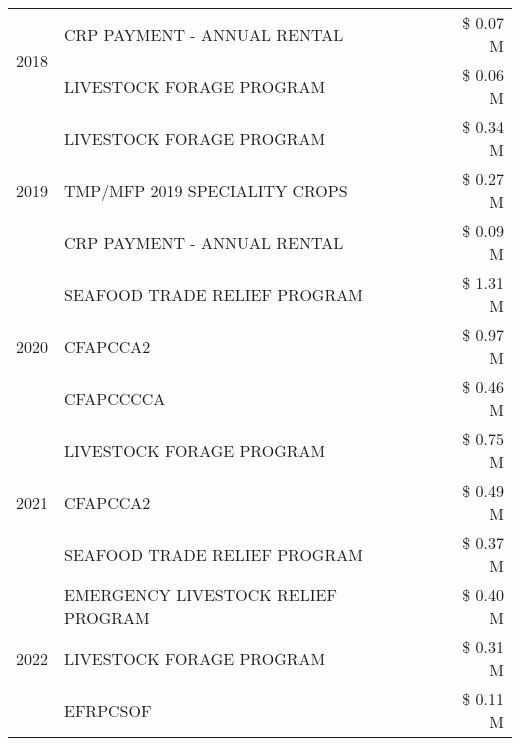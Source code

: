 \begin{tabular}{llr}
\cline{1-3}
\multirow[t]{2}{*}{2018} & CRP PAYMENT - ANNUAL RENTAL & \$ 0.07 M \\
 & LIVESTOCK FORAGE PROGRAM & \$ 0.06 M \\
\cline{1-3}
\multirow[t]{3}{*}{2019} & LIVESTOCK FORAGE PROGRAM & \$ 0.34 M \\
 & TMP/MFP 2019 SPECIALITY CROPS & \$ 0.27 M \\
 & CRP PAYMENT - ANNUAL RENTAL & \$ 0.09 M \\
\cline{1-3}
\multirow[t]{3}{*}{2020} & SEAFOOD TRADE RELIEF PROGRAM & \$ 1.31 M \\
 & CFAPCCA2 & \$ 0.97 M \\
 & CFAPCCCCA & \$ 0.46 M \\
\cline{1-3}
\multirow[t]{3}{*}{2021} & LIVESTOCK FORAGE PROGRAM & \$ 0.75 M \\
 & CFAPCCA2 & \$ 0.49 M \\
 & SEAFOOD TRADE RELIEF PROGRAM & \$ 0.37 M \\
\cline{1-3}
\multirow[t]{3}{*}{2022} & EMERGENCY LIVESTOCK RELIEF PROGRAM & \$ 0.40 M \\
 & LIVESTOCK FORAGE PROGRAM & \$ 0.31 M \\
 & EFRPCSOF & \$ 0.11 M \\
\cline{1-3}
\bottomrule
\end{tabular}
